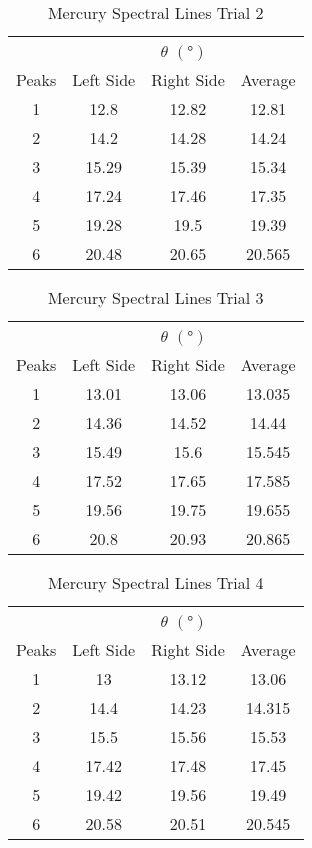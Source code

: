 \documentclass[12pt]{article}
\begin{document}
	\begin{table}[htbp]
		\centering
		\caption{Mercury Spectral Lines Trial 2}
		\begin{tabular}{cccc}
			\toprule
			& \multicolumn{3}{c}{$\theta$ $(\unit{\degree})$}  \\ \cmidrule{2-4}
			Peaks & Left Side & Right Side & Average \\
			\midrule
			1 & 12.8 & 12.82 & 12.81 \\
			2 & 14.2 & 14.28 & 14.24 \\
			3 & 15.29 & 15.39 & 15.34 \\
			4 & 17.24 & 17.46 & 17.35 \\
			5 & 19.28 & 19.5 & 19.39 \\
			6 & 20.48 & 20.65 & 20.565 \\
			\bottomrule
		\end{tabular}%
		\label{tab:MercurySpectralLinesTrial2}%
	\end{table}
	
	\begin{table}[htbp]
		\centering
		\caption{Mercury Spectral Lines Trial 3}
		\begin{tabular}{cccc}
			\toprule
			& \multicolumn{3}{c}{$\theta$ $(\unit{\degree})$}  \\ \cmidrule{2-4}
			Peaks & Left Side & Right Side & Average \\
			\midrule
			1 & 13.01 & 13.06 & 13.035 \\
			2 & 14.36 & 14.52 & 14.44 \\
			3 & 15.49 & 15.6 & 15.545 \\
			4 & 17.52 & 17.65 & 17.585 \\
			5 & 19.56 & 19.75 & 19.655 \\
			6 & 20.8 & 20.93 & 20.865 \\
			\bottomrule
		\end{tabular}%
		\label{tab:MercurySpectralLinesTrial3}%
	\end{table}
	
	\begin{table}[htbp]
		\centering
		\caption{Mercury Spectral Lines Trial 4}
		\begin{tabular}{cccc}
			\toprule
			& \multicolumn{3}{c}{$\theta$ $(\unit{\degree})$}  \\ \cmidrule{2-4}
			Peaks & Left Side & Right Side & Average \\
			\midrule
			1 & 13 & 13.12 & 13.06 \\
			2 & 14.4 & 14.23 & 14.315 \\
			3 & 15.5 & 15.56 & 15.53 \\
			4 & 17.42 & 17.48 & 17.45 \\
			5 & 19.42 & 19.56 & 19.49 \\
			6 & 20.58 & 20.51 & 20.545 \\
			\bottomrule
		\end{tabular}%
		\label{tab:MercurySpectralLinesTrial4}%
	\end{table}
	
\end{document}
